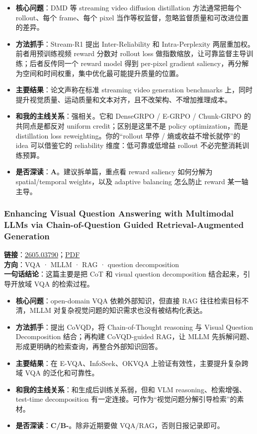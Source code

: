 \begin{itemize}[leftmargin=1.5em]
  \item \textbf{核心问题}：DMD 等 streaming video diffusion distillation 方法通常把每个 rollout、每个 frame、每个 pixel 当作等权监督，忽略监督质量和可改进位置的差异。
  \item \textbf{方法抓手}：Stream-R1 提出 Inter-Reliability 和 Intra-Perplexity 两层重加权。前者用预训练视频 reward 分数对 rollout loss 做指数缩放，让可靠监督主导训练；后者反传同一个 reward model 得到 per-pixel gradient saliency，再分解为空间和时间权重，集中优化最可能提升质量的位置。
  \item \textbf{主要结果}：论文声称在标准 streaming video generation benchmarks 上，同时提升视觉质量、运动质量和文本对齐，且不改架构、不增加推理成本。
  \item \textbf{和我的主线关系}：强相关。它和 DenseGRPO / E-GRPO / Chunk-GRPO 的共同点是都反对 uniform credit；区别是这里不是 policy optimization，而是 distillation loss reweighting。你的“rollout 早停 / 熵或收益不增长就停”的 idea 可以借鉴它的 reliability 维度：低可靠或低增益 rollout 不必完整消耗训练预算。
  \item \textbf{是否深读}：\textbf{A}。建议拆单篇，重点看 reward saliency 如何分解为 spatial/temporal weights，以及 adaptive balancing 怎么防止 reward 某一轴主导。
\end{itemize}

\subsubsection{Enhancing Visual Question Answering with Multimodal LLMs via Chain-of-Question Guided Retrieval-Augmented Generation}

\textbf{链接}：\href{https://arxiv.org/abs/2605.03790}{2605.03790}；\href{https://arxiv.org/pdf/2605.03790}{PDF}\\
\textbf{方向}：VQA · MLLM · RAG · question decomposition\\
\textbf{一句话结论}：这篇主要是把 CoT 和 visual question decomposition 结合起来，引导开放域 VQA 的检索过程。

\begin{itemize}[leftmargin=1.5em]
  \item \textbf{核心问题}：open-domain VQA 依赖外部知识，但直接 RAG 往往检索目标不清，MLLM 对复杂视觉问题的知识需求也没有被结构化表达。
  \item \textbf{方法抓手}：提出 CoVQD，将 Chain-of-Thought reasoning 与 Visual Question Decomposition 结合；再构建 CoVQD-guided RAG，让 MLLM 先拆解问题、形成更明确的检索查询，再整合外部知识回答。
  \item \textbf{主要结果}：在 E-VQA、InfoSeek、OKVQA 上验证有效性，主要提升复杂跨域 VQA 的泛化和可靠性。
  \item \textbf{和我的主线关系}：和生成后训练关系弱，但和 VLM reasoning、检索增强、test-time decomposition 有一定连接。可作为“视觉问题分解引导检索”的素材。
  \item \textbf{是否深读}：\textbf{C/B-}。除非近期要做 VQA/RAG，否则日报记录即可。
\end{itemize}

